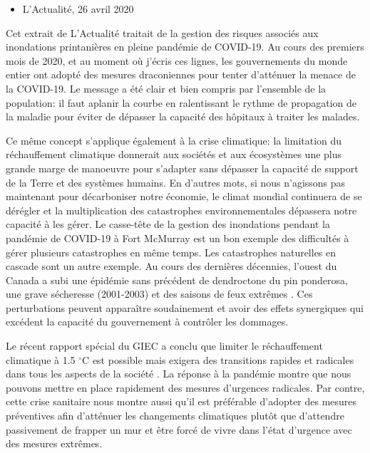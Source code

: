 \begin{itemize}
\tightlist
\item
  L'Actualité, 26 avril 2020
\end{itemize}

Cet extrait de L'Actualité traitait de la gestion des risques associés
aux inondations printanières en pleine pandémie de COVID-19. Au cours
des premiers mois de 2020, et au moment où j'écris ces lignes, les
gouvernements du monde entier ont adopté des mesures draconiennes pour
tenter d'atténuer la menace de la COVID-19. Le message a été clair et
bien compris par l'ensemble de la population: il faut aplanir la courbe
en ralentissant le rythme de propagation de la maladie pour éviter de
dépasser la capacité des hôpitaux à traiter les malades.

Ce même concept s'applique également à la crise climatique: la
limitation du réchauffement climatique donnerait aux sociétés et aux
écosystèmes une plus grande marge de manoeuvre pour s'adapter sans
dépasser la capacité de support de la Terre et des systèmes humains. En
d'autres mots, si nous n'agissons pas maintenant pour décarboniser notre
économie, le climat mondial continuera de se dérégler et la
multiplication des catastrophes environnementales dépassera notre
capacité à les gérer. Le casse-tête de la gestion des inondations
pendant la pandémie de COVID-19 à Fort McMurray est un bon exemple des
difficultés à gérer plusieurs catastrophes en même temps. Les
catastrophes naturelles en cascade sont un autre exemple. Au cours des
dernières décennies, l'ouest du Canada a subi une épidémie sans
précédent de dendroctone du pin ponderosa, une grave sécheresse
(2001-2003) et des saisons de feux extrêmes
\citep{michaelian_massive_2011, williamson_climate_2009}. Ces
perturbations peuvent apparaître soudainement et avoir des effets
synergiques qui excédent la capacité du gouvernement à contrôler les
dommages.

Le récent rapport spécial du GIEC a conclu que limiter le réchauffement
climatique à 1.5 \(^{\circ}\)C est possible mais exigera des transitions
rapides et radicales dans tous les aspects de la société
\citep{ipcc_summary_2018}. La réponse à la pandémie montre que nous
pouvons mettre en place rapidement des mesures d'urgences radicales. Par
contre, cette crise sanitaire nous montre aussi qu'il est préférable
d'adopter des mesures préventives afin d'atténuer les changements
climatiques plutôt que d'attendre passivement de frapper un mur et être
forcé de vivre dans l'état d'urgence avec des mesures extrêmes.
